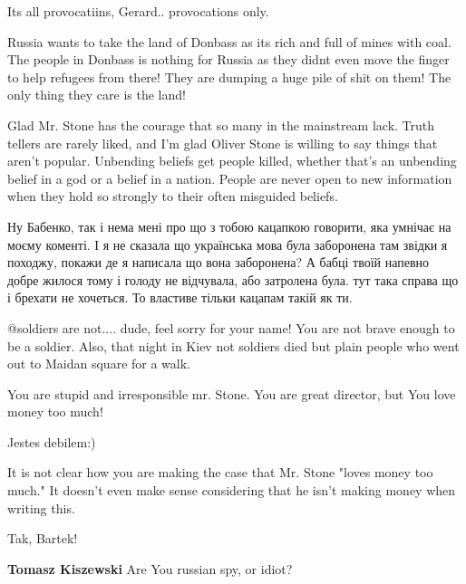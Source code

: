 \begin{itemize}
\begin{itemize}
Its all provocatiins, Gerard.. provocations only.


Russia wants to take the land of Donbass as its rich and full of mines with
coal. The people in Donbass is nothing for Russia as they didnt even move the
finger to help refugees from there! They are dumping a huge pile of shit on
them! The only thing they care is the land!


Glad Mr. Stone has the courage that so many in the mainstream lack. Truth
tellers are rarely liked, and I'm glad Oliver Stone is willing to say things
that aren't popular. Unbending beliefs get people killed, whether that's an
unbending belief in a god or a belief in a nation. People are never open to new
information when they hold so strongly to their often misguided beliefs.


Ну Бабенко, так і нема мені про що з тобою кацапкою говорити, яка умнічає на
моєму коменті. І я не сказала що українська мова була заборонена там звідки я
походжу, покажи де я написала що вона заборонена? А бабці твоїй напевно добре
жилося тому і голоду не відчувала, або затролена була. тут така справа що і
брехати не хочеться. То властиве тільки кацапам такій як ти.



@soldiers are not.... dude, feel sorry for your name! You are not brave enough
to be a soldier. Also, that night in Kiev not soldiers died but plain people
who went out to Maidan square for a walk.

\end{itemize} %


You are stupid and irresponsible mr. Stone. You are great director, but You
love money too much!

\begin{itemize} %
Jestes debilem:)


It is not clear how you are making the case that Mr. Stone "loves money too
much." It doesn't even make sense considering that he isn't making money when
writing this.


Tak, Bartek!

\textbf{Tomasz Kiszewski} Are You russian spy, or idiot?


\end{itemize}
\end{itemize}
